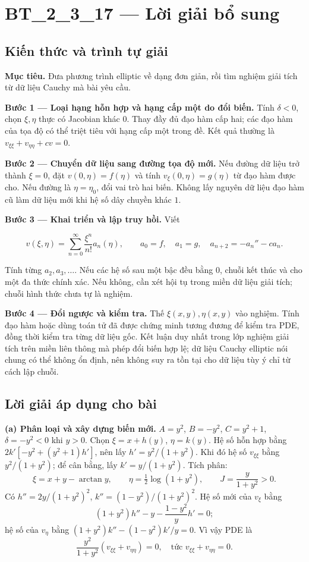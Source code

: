 \documentclass[10pt,a4paper]{article}
\begin{document}
\section*{BT\_2\_3\_17 — Lời giải bổ sung}
\subsection*{Kiến thức và trình tự giải}
\textbf{Mục tiêu.} Đưa phương trình elliptic về dạng đơn giản, rồi tìm nghiệm giải tích từ dữ liệu Cauchy mà bài yêu cầu.

\textbf{Bước 1 — Loại hạng hỗn hợp và hạng cấp một do đổi biến.} Tính $\delta<0$, chọn $\xi,\eta$ thực có Jacobian khác $0$. Thay đầy đủ đạo hàm cấp hai; các đạo hàm của tọa độ có thể triệt tiêu với hạng cấp một trong đề. Kết quả thường là $v_{\xi\xi}+v_{\eta\eta}+c v=0$.

\textbf{Bước 2 — Chuyển dữ liệu sang đường tọa độ mới.} Nếu đường dữ liệu trở thành $\xi=0$, đặt $v(0,\eta)=f(\eta)$ và tính $v_\xi(0,\eta)=g(\eta)$ từ đạo hàm được cho. Nếu đường là $\eta=\eta_0$, đổi vai trò hai biến. Không lấy nguyên dữ liệu đạo hàm cũ làm dữ liệu mới khi hệ số dây chuyền khác $1$.

\textbf{Bước 3 — Khai triển và lập truy hồi.} Viết


\[
v(\xi,\eta)=\sum_{n=0}^{\infty}\frac{\xi^n}{n!}a_n(\eta),\qquad
a_0=f,\quad a_1=g,\quad a_{n+2}=-a_n''-c a_n.
\]


Tính từng $a_2,a_3,\ldots$. Nếu các hệ số sau một bậc đều bằng $0$, chuỗi kết thúc và cho một đa thức chính xác. Nếu không, cần xét hội tụ trong miền dữ liệu giải tích; chuỗi hình thức chưa tự là nghiệm.

\textbf{Bước 4 — Đổi ngược và kiểm tra.} Thế $\xi(x,y),\eta(x,y)$ vào nghiệm. Tính đạo hàm hoặc dùng toán tử đã được chứng minh tương đương để kiểm tra PDE, đồng thời kiểm tra từng dữ liệu gốc. Kết luận duy nhất trong lớp nghiệm giải tích trên miền liên thông mà phép đổi biến hợp lệ; dữ liệu Cauchy elliptic nói chung có thể không ổn định, nên không suy ra tồn tại cho dữ liệu tùy ý chỉ từ cách lập chuỗi.
\subsection*{Lời giải áp dụng cho bài}
\textbf{(a) Phân loại và xây dựng biến mới.} $A=y^2$, $B=-y^2$, $C=y^2+1$, $\delta=-y^2<0$ khi $y>0$. Chọn $\xi=x+h(y)$, $\eta=k(y)$. Hệ số hỗn hợp bằng $2k'[-y^2+(y^2+1)h']$, nên lấy $h'=y^2/(1+y^2)$. Khi đó hệ số $v_{\xi\xi}$ bằng $y^2/(1+y^2)$; để cân bằng, lấy $k'=y/(1+y^2)$. Tích phân:
\[\xi=x+y-\arctan y,\qquad\eta=\tfrac12\log(1+y^2),\qquad J=\frac y{1+y^2}>0.\]
Có $h''=2y/(1+y^2)^2$, $k''=(1-y^2)/(1+y^2)^2$. Hệ số mới của $v_\xi$ bằng
\[(1+y^2)h''-y-\frac{1-y^2}{y}h'=0;\]
hệ số của $v_\eta$ bằng $(1+y^2)k''-(1-y^2)k'/y=0$. Vì vậy PDE là
\[\frac{y^2}{1+y^2}(v_{\xi\xi}+v_{\eta\eta})=0,\quad\text{tức }v_{\xi\xi}+v_{\eta\eta}=0.\]
\end{document}
